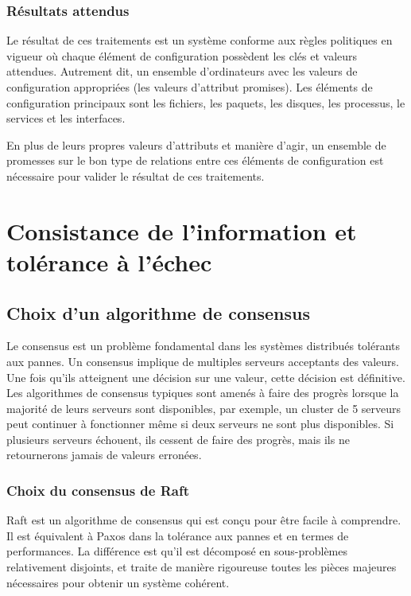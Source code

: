 \subsubsection{Résultats attendus}

Le résultat de ces traitements est un système conforme aux règles politiques en
vigueur où chaque élément de configuration possèdent les clés et valeurs
attendues.  Autrement dit, un ensemble d'ordinateurs avec les valeurs de
configuration appropriées (les valeurs d'attribut promises).  Les éléments de
configuration principaux sont les fichiers, les paquets, les disques, les
processus, le services et les interfaces. 

En plus de leurs propres valeurs d'attributs et manière d'agir, un ensemble de
promesses sur le bon type de relations entre ces éléments de configuration est
nécessaire pour valider le résultat de ces traitements.

\section{Consistance de l'information et tolérance à l'échec}

\subsection{Choix d'un algorithme de consensus}
\label{sec:consensus}

Le consensus est un problème fondamental dans les systèmes distribués tolérants
aux pannes. Un consensus implique de multiples serveurs acceptants des valeurs.
Une fois qu'ils atteignent une décision sur une valeur, cette décision est
définitive. Les algorithmes de consensus typiques sont amenés à faire des
progrès lorsque la majorité de leurs serveurs sont disponibles, par exemple, un
cluster de 5 serveurs peut continuer à fonctionner même si deux serveurs ne sont
plus disponibles. Si plusieurs serveurs échouent, ils cessent de faire des
progrès, mais ils ne retournerons jamais de valeurs erronées.

\subsubsection{Choix du consensus de Raft}

Raft est un algorithme de consensus qui est conçu pour être facile à comprendre.
Il est équivalent à Paxos dans la tolérance aux pannes et en termes de
performances. La différence est qu'il est décomposé en sous-problèmes
relativement disjoints, et traite de manière rigoureuse toutes les pièces
majeures nécessaires pour obtenir un système cohérent.

